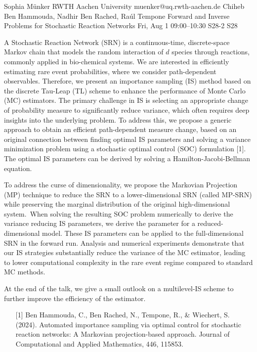 \begin{talk}
  {Sophia Münker}%
  {RWTH Aachen University}%
  {muenker@uq.rwth-aachen.de}%
  {Chiheb Ben Hammouda, Nadhir Ben Rached, Raúl Tempone}%
  {Forward and Inverse Problems for Stochastic Reaction Networks}%
  {}%
  {Fri, Aug 1 09:00–10:30}%
  {S28-2}%
  {S28}%
				
			
A Stochastic Reaction Network (SRN) is a continuous-time, discrete-space Markov chain that models the random interaction of $d$ species through reactions, commonly applied in bio-chemical systems. We are interested in efficiently estimating rare event probabilities, where we consider path-dependent observables. Therefore, we present an importance sampling (IS) method based on the discrete Tau-Leap (TL) scheme to enhance the performance of Monte Carlo (MC) estimators. The primary challenge in IS is selecting an appropriate change of probability measure to significantly reduce variance, which often requires deep insights into the underlying problem. To address this, we propose a generic approach to obtain an efficient path-dependent measure change, based on an original connection between finding optimal IS parameters and solving a variance minimization problem using a stochastic optimal control (SOC) formulation [1]. The optimal IS parameters can be derived by solving a Hamilton-Jacobi-Bellman equation.

To address the curse of dimensionality, we propose the Markovian Projection (MP) technique to reduce the SRN to a lower-dimensional SRN (called MP-SRN) while preserving the marginal distribution of the original high-dimensional system. When solving the resulting SOC problem numerically to derive the variance reducing IS parameters, we derive the parameter for a reduced-dimensional model. These IS parameters can be applied to the full-dimensional SRN in the forward run. Analysis and numerical experiments demonstrate that our IS strategies substantially reduce the variance of the MC estimator, leading to lower computational complexity in the rare event regime compared to standard MC methods. 

At the end of the talk, we give a small outlook on a multilevel-IS scheme to further improve the efficiency of the estimator.


\begin{enumerate}
   \item[{[1]}] Ben Hammouda, C., Ben Rached, N., Tempone, R., \& Wiechert, S. (2024). Automated importance sampling via optimal control for stochastic reaction networks: A Markovian projection-based approach. Journal of Computational and Applied Mathematics, 446, 115853.
\end{enumerate}

\medskip
\end{talk}


